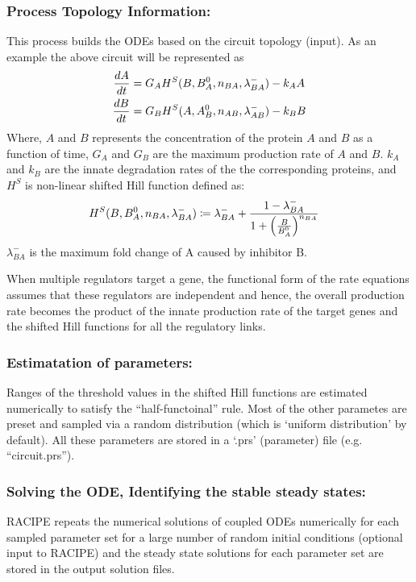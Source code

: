\documentclass{article}
\begin{document}
\subsubsection*{Process Topology Information:} This process builds 
the ODEs based on the circuit topology (input). As an example the above circuit 
will be represented as 
\begin{align}
  \frac{dA}{dt} &= G_A H^S (B, B_A^0, n_{BA}, \lambda^{-}_{BA}) - k_A A \notag \\
  \frac{dB}{dt} &= G_B H^S (A, A_B^0, n_{AB}, \lambda^{-}_{AB}) - k_B B \notag 
\end{align}
Where, $A$ and $B$ represents the concentration of the protein $A$ and $B$ as  
a function of time, $G_A$ and $G_B$ are the maximum production rate of $A$ and 
$B$. $k_A$ and $k_B$ are the innate degradation rates of the the corresponding 
proteins, and $H^S$ is non-linear shifted Hill function defined as:
\begin{align}
  H^S (B, B_A^0, n_{BA}, \lambda^{-}_{BA}) & \coloneqq  \lambda^{-}_{BA} +
   \frac{1 -\lambda^{-}_{BA}}{1 + \left( \frac{B}{B_A^0}\right)^{n_{BA}}}
   \notag
\end{align} 
$\lambda^{-}_{BA}$ is the maximum fold change of A caused by inhibitor B. 

When multiple regulators target a gene, the functional form of the rate equations 
assumes that these regulators are independent and hence, the overall production
rate becomes the product of the innate production rate of the target genes and 
the shifted Hill functions for all the regulatory links. 

\subsubsection*{Estimatation of parameters:}
Ranges of the threshold values in the shifted Hill functions are estimated 
numerically to satisfy the ``half-functoinal'' rule. Most of the other 
parametes are preset and sampled via a random distribution (which is `uniform 
distribution' by default). All these parameters are stored in a `.prs' (parameter)
file (e.g. ``circuit.prs'').

\subsubsection*{Solving the ODE, Identifying the stable steady states:} RACIPE 
repeats the numerical solutions of coupled ODEs numerically for each sampled parameter
set for a large number of random initial conditions (optional input to RACIPE) 
and the steady state solutions for each parameter set are stored in the output 
solution files.  
\newpage
\end{document}
